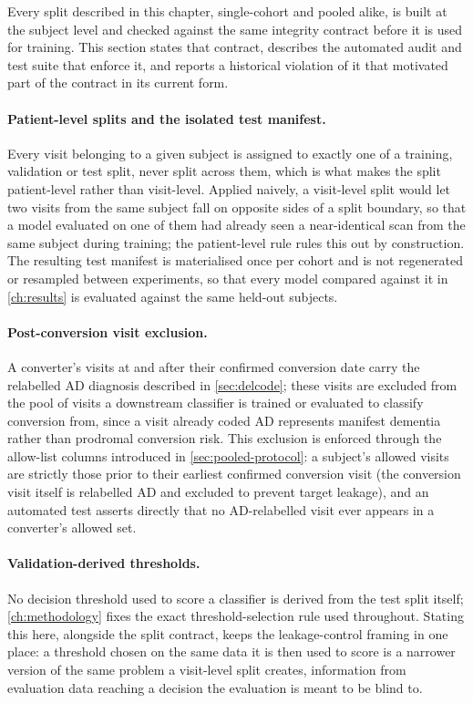 Every split described in this chapter, single-cohort and pooled alike, is built at the
subject level and checked against the same integrity contract before it is used for
training. This section states that contract, describes the automated audit and test suite
that enforce it, and reports a historical violation of it that motivated part of the
contract in its current form.

\paragraph{Patient-level splits and the isolated test manifest.} Every visit belonging to a
given subject is assigned to exactly one of a training, validation or test split, never
split across them, which is what makes the split patient-level rather than visit-level.
Applied naively, a visit-level split would let two visits from the same subject fall on
opposite sides of a split boundary, so that a model evaluated on one of them had already
seen a near-identical scan from the same subject during training; the patient-level rule
rules this out by construction. The resulting test manifest is materialised once per cohort
and is not regenerated or resampled between experiments, so that every model compared
against it in \autoref{ch:results} is evaluated against the same held-out subjects.

\paragraph{Post-conversion visit exclusion.} A converter's visits at and after their confirmed
conversion date carry the relabelled \ac{AD} diagnosis described in
\autoref{sec:delcode}; these visits are excluded from the pool of visits a downstream
classifier is trained or evaluated to classify conversion from, since a visit already coded
\ac{AD} represents manifest dementia rather than prodromal conversion risk.
This exclusion is enforced through the allow-list columns introduced in
\autoref{sec:pooled-protocol}: a subject's allowed visits are strictly those prior to their
earliest confirmed conversion visit (the conversion visit itself is relabelled \ac{AD} and excluded
to prevent target leakage), and an automated test asserts directly that no
\ac{AD}-relabelled visit ever appears in a converter's allowed set.

\paragraph{Validation-derived thresholds.} No decision threshold used to score a classifier
is derived from the test split itself; \autoref{ch:methodology} fixes the exact
threshold-selection rule used throughout. Stating this here, alongside the split contract,
keeps the leakage-control framing in one place: a threshold chosen on the same data it is
then used to score is a narrower version of the same problem a visit-level split creates,
information from evaluation data reaching a decision the evaluation is meant to be blind
to.

